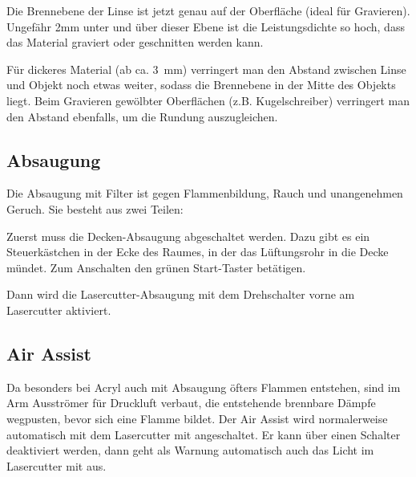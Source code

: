 \documentclass{\basedir/fablab-document}
\newcommand{\knopf}[2]{
    \begin{tikzpicture}[baseline={(box.base)}]
    \node [#1] (box) {
        \fontsize{9pt}{9pt}\selectfont \textbf{#2}\strut
    };
    \end{tikzpicture}
}
\newcommand{\lueftungKnopf}[1]{\knopf{lueftungsknopf}{#1}}
\newcommand{\reflectboxX}[1]{\raisebox{\depth}{\scalebox{1}[-1]{#1}}} %
\newcommand{\returnSymbol}{\reflectboxX{\ensuremath{\mathbf{\Lsh}}}} %
\newcommand{\lueftungEnter}{\lueftungKnopf{\returnSymbol}}
\newcommand{\lueftungMinus}{\lueftungKnopf{-}}
\newcommand{\lueftungPlus}{\lueftungKnopf{+}}
\newcommand{\lueftungOn}{\lueftungKnopf{On}}
\newcommand{\lueftungOff}{\lueftungKnopf{Off}}
\begin{document}
Die Brennebene der Linse ist jetzt genau auf der Oberfläche (ideal für Gravieren). Ungefähr 2mm unter und über dieser Ebene ist die Leistungsdichte so hoch, dass das Material graviert oder geschnitten werden kann.

Für dickeres Material (ab ca. 3\ mm) verringert man den Abstand zwischen Linse und Objekt noch etwas weiter, sodass die Brennebene in der Mitte des Objekts liegt. Beim Gravieren gewölbter Oberflächen (z.B. Kugelschreiber) verringert man den Abstand ebenfalls, um die Rundung auszugleichen.


\subsection{Absaugung}
\label{sec:absaugung}

Die Absaugung mit Filter ist gegen Flammenbildung, Rauch und unangenehmen Geruch. Sie besteht aus zwei Teilen:

Zuerst muss die Decken-Absaugung abgeschaltet werden. Dazu gibt es ein Steuerkästchen in der Ecke des Raumes, in der das Lüftungsrohr in die Decke mündet. Zum Anschalten den grünen Start-Taster betätigen.

Dann wird die Lasercutter-Absaugung mit dem Drehschalter vorne am Lasercutter aktiviert.


\pagebreak

\subsection{Air Assist}
\label{sec:air-assist}
Da besonders bei Acryl auch mit Absaugung öfters Flammen entstehen, sind im Arm Ausströmer für Druckluft verbaut, die entstehende brennbare Dämpfe wegpusten, bevor sich eine Flamme bildet. Der Air Assist wird normalerweise automatisch mit dem Lasercutter mit angeschaltet. Er kann über einen Schalter deaktiviert werden, dann geht als Warnung automatisch auch das Licht im Lasercutter mit aus.
\end{document}
